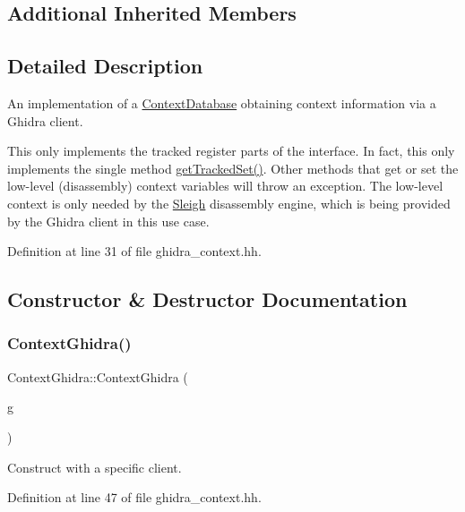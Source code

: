 \subsection*{Additional Inherited Members}


\subsection{Detailed Description}
An implementation of a \mbox{\hyperlink{class_context_database}{Context\+Database}} obtaining context information via a Ghidra client. 

This only implements the tracked register parts of the interface. In fact, this only implements the single method \mbox{\hyperlink{class_context_ghidra_a4f6d11b1a9dd101791a11ee522139828}{get\+Tracked\+Set()}}. Other methods that get or set the low-\/level (disassembly) context variables will throw an exception. The low-\/level context is only needed by the \mbox{\hyperlink{class_sleigh}{Sleigh}} disassembly engine, which is being provided by the Ghidra client in this use case. 

Definition at line 31 of file ghidra\+\_\+context.\+hh.



\subsection{Constructor \& Destructor Documentation}
\mbox{\label{class_context_ghidra_aa6ec9c1a7ef11712b1a1d8386dd84eba}} 
\subsubsection{\texorpdfstring{ContextGhidra()}{ContextGhidra()}}
{\footnotesize\ttfamily Context\+Ghidra\+::\+Context\+Ghidra (\begin{DoxyParamCaption}\item[{\mbox{\hyperlink{class_architecture_ghidra}{Architecture\+Ghidra}} $\ast$}]{g }\end{DoxyParamCaption})\hspace{0.3cm}{\ttfamily [inline]}}



Construct with a specific client. 



Definition at line 47 of file ghidra\+\_\+context.\+hh.

